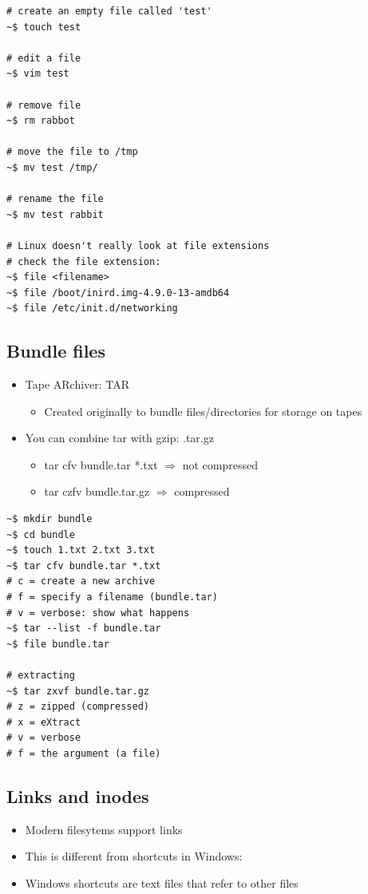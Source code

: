 \documentclass{article}
\begin{document}
\begin{verbatim}
# create an empty file called 'test'
~$ touch test

# edit a file
~$ vim test

# remove file
~$ rm rabbot

# move the file to /tmp
~$ mv test /tmp/

# rename the file
~$ mv test rabbit

# Linux doesn't really look at file extensions
# check the file extension:
~$ file <filename>
~$ file /boot/inird.img-4.9.0-13-amdb64
~$ file /etc/init.d/networking
\end{verbatim}

\subsection{Bundle files}

\begin{itemize}
    \item Tape ARchiver: TAR
    \begin{itemize}
        \item Created originally to bundle files/directories for storage on tapes
    \end{itemize}
    \item You can combine tar with gzip: .tar.gz
    \begin{itemize}
        \item tar cfv bundle.tar *.txt $\Rightarrow$ not compressed
        \item tar czfv bundle.tar.gz $\Rightarrow$ compressed
    \end{itemize}
\end{itemize}

\begin{verbatim}
~$ mkdir bundle
~$ cd bundle
~$ touch 1.txt 2.txt 3.txt
~$ tar cfv bundle.tar *.txt
# c = create a new archive
# f = specify a filename (bundle.tar)
# v = verbose: show what happens
~$ tar --list -f bundle.tar
~$ file bundle.tar

# extracting
~$ tar zxvf bundle.tar.gz
# z = zipped (compressed)
# x = eXtract
# v = verbose
# f = the argument (a file) 
\end{verbatim}

\subsection{Links and inodes}

\begin{itemize}
    \item Modern filesytems support links
    \item This is different from shortcuts in Windows:
    \item Windows shortcuts are text files that refer to other files
\end{itemize}
\end{document}
